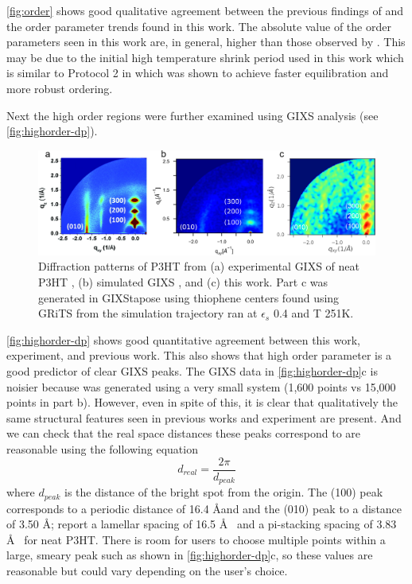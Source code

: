 \autoref{fig:order} shows good qualitative agreement between the previous findings of \citet{Miller2018} and the order parameter trends found in this work. The absolute value of the order parameters seen in this work are, in general, higher than those observed by \citet{Miller2018}. This may be due to the initial high temperature shrink period used in this work which is similar to Protocol 2 in \citet{Miller2018} which was shown to achieve faster equilibration and more robust ordering.

Next the high order regions were further examined using GIXS analysis (see \autoref{fig:highorder-dp}).

\begin{figure}
    \centering
    \includegraphics[width=0.8\linewidth]{figures/p3ht_val/Miller2018_fig6comparison.png}
    \caption{Diffraction patterns of P3HT from (a) experimental GIXS of neat P3HT \cite{Ko2012}, (b) simulated GIXS \citep{Miller2018}, and (c) this work. Part c was generated in GIXStapose using thiophene centers found using GRiTS from the simulation trajectory ran at $\epsilon_{s}$ 0.4 and T 251K.}\label{fig:highorder-dp}
\end{figure}

\autoref{fig:highorder-dp} shows good quantitative agreement between this work, experiment, and previous work. This also shows that high order parameter is a good predictor of clear GIXS peaks.
The GIXS data in \autoref{fig:highorder-dp}c is noisier because was generated using a very small system (1,600 points vs 15,000 points in part b). However, even in spite of this, it is clear that qualitatively the same structural features seen in previous works and experiment are present. 
And we can check that the real space distances these peaks correspond to are reasonable using the following equation
\begin{equation}\label{eq:peaks_to_dspace}
    d_{real} = \frac{2 \pi}{d_{peak}}
\end{equation}
where $d_{peak}$ is the distance of the bright spot from the origin.
The (100) peak corresponds to a periodic distance of 16.4 \AA and and the (010) peak to a distance of 3.50 \AA; \citet{Duong2013} report a lamellar spacing of 16.5 \AA~ and a pi-stacking spacing of 3.83 \AA~ for neat P3HT. 
There is room for users to choose multiple points within a large, smeary peak such as shown in \autoref{fig:highorder-dp}c, so these values are reasonable but could vary depending on the user's choice.

